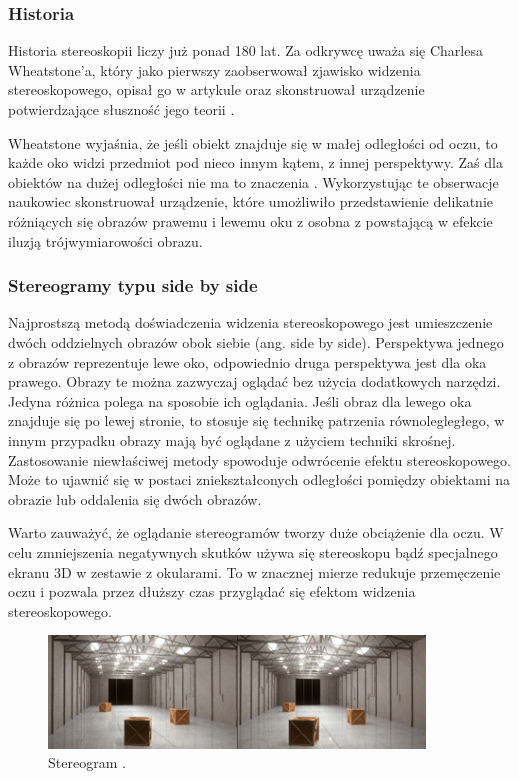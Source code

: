 \subsubsection{Historia} 
Historia stereoskopii liczy już ponad 180 lat. Za odkrywcę uważa się Charlesa Wheatstone'a, który jako pierwszy zaobserwował zjawisko widzenia stereoskopowego, opisał go w artykule oraz skonstruował urządzenie potwierdzające słuszność jego teorii \cite{stereoscopehistory}.

Wheatstone wyjaśnia, że jeśli obiekt znajduje się w małej odległości od oczu, to każde oko widzi przedmiot pod nieco innym kątem, z innej perspektywy. Zaś dla obiektów na dużej odległości nie ma to znaczenia \cite{wheatstone}. Wykorzystując te obserwacje naukowiec skonstruował urządzenie, które umożliwiło przedstawienie delikatnie różniących się obrazów prawemu i lewemu oku z osobna z powstającą w efekcie iluzją trójwymiarowości obrazu.

\subsubsection{Stereogramy typu side by side}
Najprostszą metodą doświadczenia widzenia stereoskopowego jest umieszczenie dwóch oddzielnych obrazów obok siebie (ang. side by side). Perspektywa jednego z obrazów reprezentuje lewe oko, odpowiednio druga perspektywa jest dla oka prawego. Obrazy te można zazwyczaj oglądać bez użycia dodatkowych narzędzi. Jedyna różnica polega na sposobie ich oglądania. Jeśli obraz dla lewego oka znajduje się po lewej stronie, to stosuje się technikę patrzenia równolegległego, w innym przypadku obrazy mają być oglądane z użyciem techniki skrośnej. Zastosowanie niewłaściwej metody spowoduje odwrócenie efektu stereoskopowego. Może to ujawnić się w postaci zniekształconych odległości pomiędzy obiektami na obrazie lub oddalenia się dwóch obrazów.

Warto zauważyć, że oglądanie stereogramów tworzy duże obciążenie dla oczu. W celu zmniejszenia negatywnych skutków używa się stereoskopu bądź specjalnego ekranu 3D w zestawie z okularami. To w znacznej mierze redukuje przemęczenie oczu i pozwala przez dłuższy czas przyglądać się efektom widzenia stereoskopowego.
\begin{figure}[H]
		\centering
 		\includegraphics[width=10cm]{sbs.jpg}
    	\caption{Stereogram \cite{sidebyside}.}
 		\label{rys1}
\end{figure}

